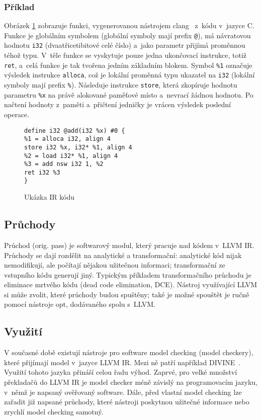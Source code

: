 \documentclass[12pt]{fithesis2}
\begin{document}
\subsubsection{Příklad}
Obrázek \ref{IR-EX} zobrazuje funkci, vygenerovanou nástrojem clang~\cite{clang} z~kódu v~jazyce C. Funkce je globálním symbolem (globální symboly mají prefix \texttt{@}), má návratovou hodnotu \texttt{i32} (dvaatřicetibitové celé číslo) a~jako parametr přijímá proměnnou téhož typu. V~těle funkce se vyskytuje pouze jedna ukončovací instrukce, totiž \texttt{ret}, a~celá funkce je tak tvořena jedním základním blokem. Symbol \texttt{\%1} označuje výsledek instrukce \texttt{alloca}, což je lokální proměnná typu ukazatel na \texttt{i32} (lokální symboly mají prefix \texttt{\%}). Následuje instrukce \texttt{store}, která zkopíruje hodnotu parametru \texttt{\%x} na právě alokované paměťové místo a~nevrací žádnou hodnotu. Po načtení hodnoty z~paměti a~přičtení jedničky je vrácen výsledek poslední operace.


\begin{figure}[h!]
\begin{lstlisting}
define i32 @add(i32 %x) #0 {
%1 = alloca i32, align 4
store i32 %x, i32* %1, align 4
%2 = load i32* %1, align 4
%3 = add nsw i32 1, %2
ret i32 %3
}
\end{lstlisting}
\caption{Ukázka IR kódu}
\label{IR-EX}
\end{figure}

\subsection{Průchody}
Průchod (orig. pass) je softwarový modul, který pracuje nad kódem v~LLVM IR. Průchody se dají rozdělit na analytické a transformační: analytické kód nijak nemodifikují, ale počítají nějakou užitečnou informaci; transformační ze vstupního kódu generují jiný. Typickým příkladem transformačního průchodu je eliminace mrtvého kódu (dead code elimination, DCE). Nástroj využívající LLVM si může zvolit, které průchody budou spuštěny; také je možné spouštět je ručně pomocí nástroje opt, dodávaného spolu s~LLVM.

\subsection{Využití}
V současné době existují nástroje pro software model checking (model checkery), které přijímají model v~jazyce LLVM IR. Mezi ně patří například DIVINE~\cite{BBH+13}. Využití tohoto jazyka přináší celou řadu výhod. Zaprvé, pro velké množství překladačů do LLVM IR je model checker méně závislý na programovacím jazyku, v~němž je napsaný ověřovaný software. Dále, před vlastní model checking lze zařadit již napsané průchody, které nástroji poskytnou užitečné informace nebo zrychlí model checking samotný.
\end{document}
